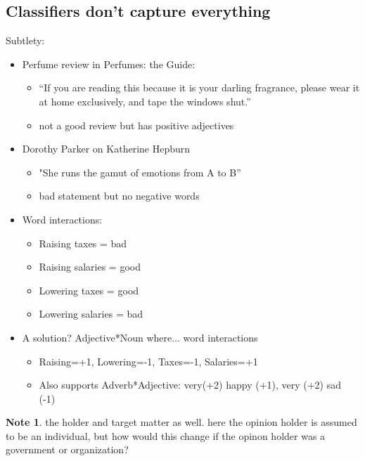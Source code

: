 \documentclass[11pt]{article}
\theoremstyle{definition}
\newtheorem{note}{Note}
\begin{document}
\subsection{Classifiers don’t capture everything}
Subtlety:

\begin{itemize}
  \item Perfume review in Perfumes: the Guide:
  \begin{itemize}
    \item “If you are reading this because it is your darling fragrance,
    please wear it at home exclusively, and tape the windows
    shut.”
    \item not a good review but has positive adjectives
  \end{itemize}
  \item Dorothy Parker on Katherine Hepburn
  \begin{itemize}
    \item "She runs the gamut of emotions from A to B”
    \item bad statement but no negative words
  \end{itemize}
\end{itemize}

\begin{itemize}
  \item Word interactions:
  \begin{itemize}
    \item Raising taxes = bad
    \item Raising salaries = good
    \item Lowering taxes = good
    \item Lowering salaries = bad
  \end{itemize}
  \item A solution? Adjective*Noun where... word interactions
  \begin{itemize}
    \item Raising=+1, Lowering=-1, Taxes=-1, Salaries=+1
    \item Also supports Adverb*Adjective: very(+2) happy (+1), very (+2) sad (-1)
  \end{itemize}
\end{itemize}

\begin{note}
  the holder and target matter as well. here the opinion holder is assumed to be an individual, but how would this change if the opinon holder was a government or organization?
\end{note}
\end{document}

